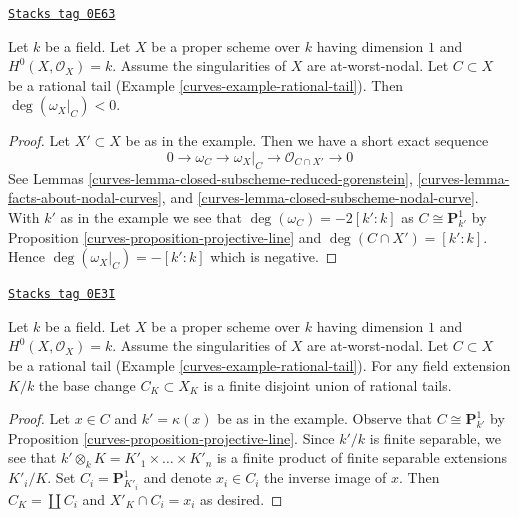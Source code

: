 \begin{lemma}
\label{curves-lemma-rational-tail-negative}
\href{https://stacks.math.columbia.edu/tag/0E63}{\texttt{Stacks tag 0E63}}

Let $k$ be a field. Let $X$ be a proper scheme over $k$ having dimension $1$
and $H^0(X, \mathcal{O}_X) = k$. Assume the singularities of $X$ are
at-worst-nodal. Let $C \subset X$ be a rational tail
(Example \ref{curves-example-rational-tail}). Then $\deg(\omega_X|_C) < 0$.
\end{lemma}

\begin{proof}

Let $X' \subset X$ be as in the example. Then we have a short exact
sequence
$$
0 \to \omega_C \to \omega_X|_C \to \mathcal{O}_{C \cap X'} \to 0
$$
See Lemmas \ref{curves-lemma-closed-subscheme-reduced-gorenstein},
\ref{curves-lemma-facts-about-nodal-curves}, and
\ref{curves-lemma-closed-subscheme-nodal-curve}.
With $k'$ as in the example we see that $\deg(\omega_C) = -2[k' : k]$
as $C \cong \mathbf{P}^1_{k'}$ by Proposition \ref{curves-proposition-projective-line}
and $\deg(C \cap X') = [k' : k]$.
Hence $\deg(\omega_X|_C) = -[k' : k]$ which is negative.
\end{proof}

\begin{lemma}
\label{curves-lemma-rational-tail-field-extension}
\href{https://stacks.math.columbia.edu/tag/0E3I}{\texttt{Stacks tag 0E3I}}

Let $k$ be a field. Let $X$ be a proper scheme over $k$ having dimension $1$
and $H^0(X, \mathcal{O}_X) = k$. Assume the singularities of $X$ are
at-worst-nodal. Let $C \subset X$ be a rational tail
(Example \ref{curves-example-rational-tail}).
For any field extension $K/k$ the base change $C_K \subset X_K$
is a finite disjoint union of rational tails.
\end{lemma}

\begin{proof}

Let $x \in C$ and $k' = \kappa(x)$ be as in the example.
Observe that $C \cong \mathbf{P}^1_{k'}$ by
Proposition \ref{curves-proposition-projective-line}.
Since $k'/k$ is finite separable, we see that
$k' \otimes_k K = K'_1 \times \ldots \times K'_n$
is a finite product of finite separable extensions $K'_i/K$.
Set $C_i = \mathbf{P}^1_{K'_i}$ and denote $x_i \in C_i$
the inverse image of $x$. Then $C_K = \coprod C_i$ and
$X'_K \cap C_i = x_i$ as desired.
\end{proof}

